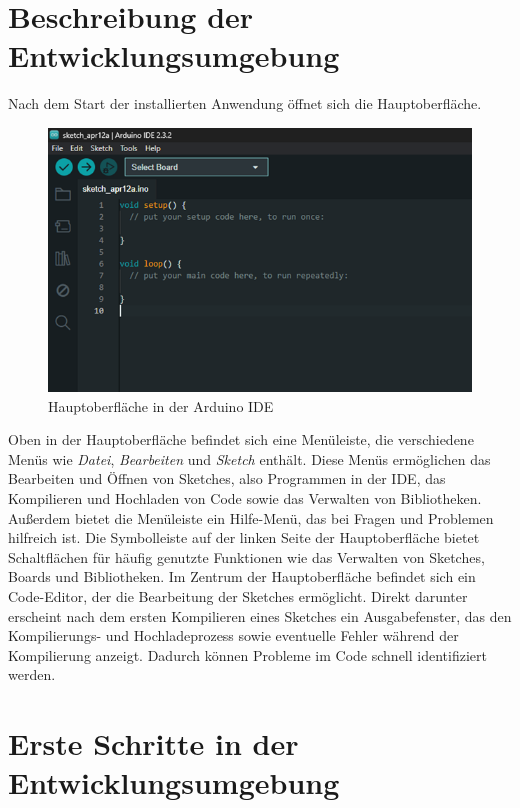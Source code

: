 \section{Beschreibung der Entwicklungsumgebung}
Nach dem Start der installierten Anwendung öffnet sich die Hauptoberfläche.
\begin{figure}[htb]
	\begin{center}
		\includegraphics[width=\textwidth]{General/HauptoberflaecheIDE.png}
		\caption{Hauptoberfläche in der Arduino IDE} \label{Hauptoberfläche in der Arduino IDE}
	\end{center}
\end{figure}
Oben in der Hauptoberfläche befindet sich eine Menüleiste, die verschiedene Menüs wie \textit{Datei}, \textit{Bearbeiten} und \textit{Sketch} enthält. Diese Menüs ermöglichen das Bearbeiten und Öffnen von Sketches, also Programmen in der IDE, das Kompilieren und Hochladen von Code sowie das Verwalten von Bibliotheken. Außerdem bietet die Menüleiste ein Hilfe-Menü, das bei Fragen und Problemen hilfreich ist. 
Die Symbolleiste auf der linken Seite der Hauptoberfläche bietet Schaltflächen für häufig genutzte Funktionen wie das Verwalten von Sketches, Boards und Bibliotheken.
Im Zentrum der Hauptoberfläche befindet sich ein Code-Editor, der die Bearbeitung der Sketches ermöglicht. Direkt darunter erscheint nach dem ersten Kompilieren eines Sketches ein Ausgabefenster, das den Kompilierungs- und Hochladeprozess sowie eventuelle Fehler während der Kompilierung anzeigt. Dadurch können Probleme im Code schnell identifiziert werden.

\section{Erste Schritte in der Entwicklungsumgebung}
